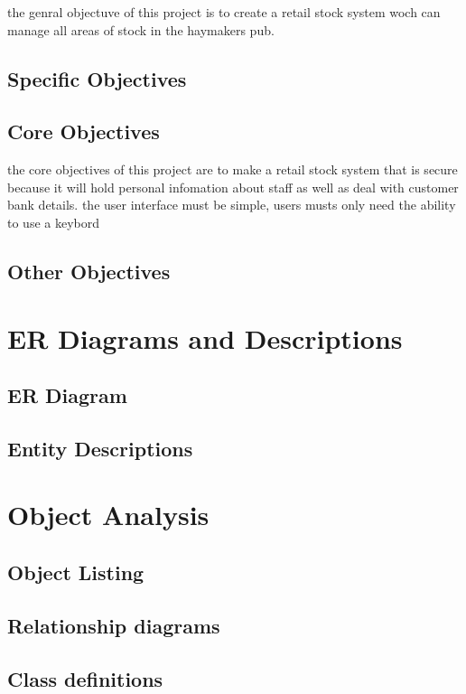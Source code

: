 the genral objectuve of this project is to create a retail stock system woch can manage all areas of stock in the haymakers pub.

\subsection{Specific Objectives}

\subsection{Core Objectives}

the core objectives of this project are to make a retail stock system that is secure because it will hold personal infomation about staff as well as deal with customer bank details. the user interface must be simple, users musts only need the ability to use a keybord 

\subsection{Other Objectives}

\section{ER Diagrams and Descriptions}

\subsection{ER Diagram}

\subsection{Entity Descriptions}

\section{Object Analysis}

\subsection{Object Listing}

\subsection{Relationship diagrams}

\subsection{Class definitions}

